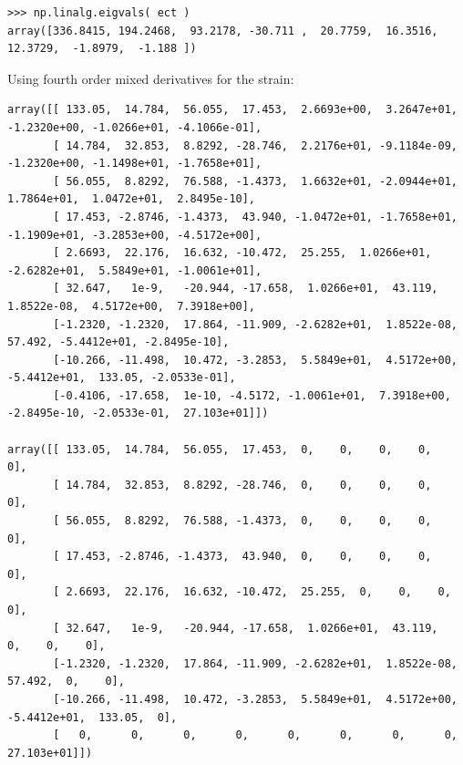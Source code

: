 \documentclass[11pt]{article}
\begin{document}
\begin{enumerate}
\begin{enumerate}
\begin{enumerate}
\begin{enumerate}
\begin{verbatim}
>>> np.linalg.eigvals( ect )
array([336.8415, 194.2468,  93.2178, -30.711 ,  20.7759,  16.3516,  12.3729,  -1.8979,  -1.188 ])

\end{verbatim}
Using fourth order mixed derivatives for the strain:
\begin{verbatim}
array([[ 133.05,  14.784,  56.055,  17.453,  2.6693e+00,  3.2647e+01, -1.2320e+00, -1.0266e+01, -4.1066e-01],
       [ 14.784,  32.853,  8.8292, -28.746,  2.2176e+01, -9.1184e-09, -1.2320e+00, -1.1498e+01, -1.7658e+01],
       [ 56.055,  8.8292,  76.588, -1.4373,  1.6632e+01, -2.0944e+01,  1.7864e+01,  1.0472e+01,  2.8495e-10],
       [ 17.453, -2.8746, -1.4373,  43.940, -1.0472e+01, -1.7658e+01, -1.1909e+01, -3.2853e+00, -4.5172e+00],
       [ 2.6693,  22.176,  16.632, -10.472,  25.255,  1.0266e+01, -2.6282e+01,  5.5849e+01, -1.0061e+01],
       [ 32.647,   1e-9,   -20.944, -17.658,  1.0266e+01,  43.119,  1.8522e-08,  4.5172e+00,  7.3918e+00],
       [-1.2320, -1.2320,  17.864, -11.909, -2.6282e+01,  1.8522e-08,  57.492, -5.4412e+01, -2.8495e-10],
       [-10.266, -11.498,  10.472, -3.2853,  5.5849e+01,  4.5172e+00, -5.4412e+01,  133.05, -2.0533e-01],
       [-0.4106, -17.658,  1e-10, -4.5172, -1.0061e+01,  7.3918e+00, -2.8495e-10, -2.0533e-01,  27.103e+01]])

array([[ 133.05,  14.784,  56.055,  17.453,  0,    0,    0,    0,    0],
       [ 14.784,  32.853,  8.8292, -28.746,  0,    0,    0,    0,    0],
       [ 56.055,  8.8292,  76.588, -1.4373,  0,    0,    0,    0,    0],
       [ 17.453, -2.8746, -1.4373,  43.940,  0,    0,    0,    0,    0],
       [ 2.6693,  22.176,  16.632, -10.472,  25.255,  0,    0,    0,    0],
       [ 32.647,   1e-9,   -20.944, -17.658,  1.0266e+01,  43.119,   0,    0,    0],
       [-1.2320, -1.2320,  17.864, -11.909, -2.6282e+01,  1.8522e-08,  57.492,  0,    0],
       [-10.266, -11.498,  10.472, -3.2853,  5.5849e+01,  4.5172e+00, -5.4412e+01,  133.05,  0],
       [   0,      0,      0,      0,      0,      0,      0,      0,     27.103e+01]])


\end{verbatim}
\end{enumerate}
\end{enumerate}
\end{enumerate}
\end{enumerate}
\end{document}
